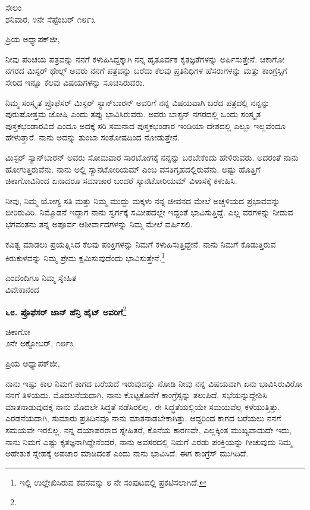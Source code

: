 \begin{flushright}
ಸೇಲಂ\\ಶನಿವಾರ, ೪ನೇ ಸೆಪ್ಟೆಂಬರ್ ೧೮೯೩
\end{flushright}

\noindent
ಪ್ರಿಯ ಅಧ್ಯಾಪಕ್‌ಜೀ,

ನೀವು ಪರಿಚಯ ಪತ್ರವನ್ನು ನನಗೆ ಕಳುಹಿಸಿದ್ದಕ್ಕಾಗಿ ನನ್ನ ಹೃತೂರ್ವಕ ಕೃತಜ್ಞತೆಗಳನ್ನು ಅರ್ಪಿಸುತ್ತೇನೆ. ಚಿಕಾಗೋ ನಗರದ ಮಿಸ್ಟರ್‌ ಥೇಲ್ಸ್ ಅವರು ನನಗೆ ಪತ್ರವನ್ನು ಬರೆದು ಕೆಲವು ಪ್ರತಿನಿಧಿಗಳ ಹೆಸರುಗಳನ್ನು ಮತ್ತು ಕಾಂಗ್ರೆಸ್ಸಿಗೆ ಸೇರಿದ ಇನ್ನೂ ಕೆಲವು ವಿಷಯಗಳನ್ನು ಸೂಚಿಸಿರುವರು.

ನಿಮ್ಮ ಸಂಸ್ಕೃತ ಪ್ರೊಫೆಸರ್ ಮಿಸ್ಟರ್ ಸ್ಯಾನ್‌ಬಾರನ್ ಅವರಿಗೆ ನನ್ನ ವಿಷಯವಾಗಿ ಬರೆದ ಪತ್ರದಲ್ಲಿ ನನ್ನನ್ನು ಪುರುಷೋತ್ತಮ ಜೋಷಿ ಎಂದು ತಪ್ಪು ಭಾವಿಸಿರುವರು. ಅವರು ಬಾಸ್ಟನ್ ನಗರದಲ್ಲಿ ಒಂದು ಸಂಸ್ಕೃತ ಪುಸ್ತಕಭಂಡಾರವಿದೆ ಎಂದೂ ಅದಕ್ಕೆ ಸರಿ ಸಮನಾದ ಪುಸ್ತಕಭಂಡಾರ ಇಂಡಿಯಾ ದೇಶದಲ್ಲಿ ಎಲ್ಲೂ ಇಲ್ಲವೆಂದೂ ಹೇಳುತ್ತಾರೆ. ನಾನು ಅದನ್ನು ತುಂಬಾ ಸಂತೋಷದಿಂದ ನೋಡುತ್ತೇನೆ.

ಮಿಸ್ಟರ್ ಸ್ಯಾನ್‌ಬಾರನ್ ಅವರು ಸೋಮವಾರ ಸಾರಟೋಗಕ್ಕೆ ನನ್ನನ್ನು ಬರಬೇಕೆಂದು ಹೇಳಿರುವರು. ಅದರಂತೆ ನಾನು ಹೋಗುತ್ತಿರುವೆನು. ನಾನು ಅಲ್ಲಿ ಸ್ಯಾನಟೋರಿಯಮ್ ಎಂಬ ವಸತಿಗೃಹದಲ್ಲಿರುವೆನು. ಅಷ್ಟು ಹೊತ್ತಿಗೆ ಚಿಕಾಗೋವಿನಿಂದ ಏನಾದರೂ ಸಮಾಚಾರ ಬಂದರೆ ಸ್ಕಾನಟೋರಿಯಮ್ ವಿಳಾಸಕ್ಕೆ ಕಳುಹಿಸಿ.

ನೀವು, ನಿಮ್ಮ ಯೋಗ್ಯ ಸತಿ ಮತ್ತು ನಿಮ್ಮ ಮುದ್ದು ಮಕ್ಕಳು ನನ್ನ ಜೀವನದ ಮೇಲೆ ಅಚ್ಚಳಿಯದ ಪ್ರಭಾವವನ್ನು ಬೀರಿರುವಿರಿ. ನಿಮ್ಮೊಡನೆ ಇದ್ದಾಗ ನಾನು ಸ್ವರ್ಗಕ್ಕೆ ಸಮೀಪದಲ್ಲೇ ಇದ್ದಂತೆ ಭಾವಿಸುತ್ತಿದ್ದೆ. ಎಲ್ಲ ವರಗಳನ್ನು ನೀಡುವ ಭಗವಂತನು ತನ್ನ ಅಪೂರ್ವ ಆಶೀರ್ವಾದಗಳನ್ನು ನಿಮ್ಮ ಮೇಲೆ ವರ್ಷಿಸಲಿ.

ಕವಿತ್ವ ಮಾಡಲು ಪ್ರಯತ್ನಿಸಿದ ಕೆಲವು ಪಂಕ್ತಿಗಳನ್ನು ನಿಮಗೆ ಕಳುಹಿಸುತ್ತಿದ್ದೇನೆ. ನಾನು ನಿಮಗೆ ಕೊಡುತ್ತಿರುವ ಕಿರುಕುಳವನ್ನು ನಿಮ್ಮ ಪ್ರೇಮ ಕ್ಷಮಿಸುವುದೆಂದು ಭಾವಿಸುತ್ತೇನೆ.\footnote{ಇಲ್ಲಿ ಉಲ್ಲೇಖಿಸಿರುವ ಕವನವನ್ನು ೮ ನೇ ಸಂಪುಟದಲ್ಲಿ ಪ್ರಕಟಿಸಲಾಗಿದೆ.}

{\flushright
ಎಂದೆಂದಿಗೂ ನಿಮ್ಮ ಸ್ನೇಹಿತ\\ವಿವೇಕಾನಂದ\par}

\eject

\begin{center}
\textbf{೬೮. ಪ್ರೊಫೆಸರ್ ಜಾನ್ ಹೆನ್ರಿ ಹೈಟ್ ಅವರಿಗೆ}\footnote{}
\end{center}

\begin{flushright}
ಚಿಕಾಗೋ\\೨ನೇ ಅಕ್ಟೋಬರ್, ೧೮೯೩
\end{flushright}

\noindent
ಪ್ರಿಯ ಅಧ್ಯಾಪಕ್‌ಜೀ,

ನಾನು ಇಷ್ಟು ಕಾಲ ನಿಮಗೆ ಕಾಗದ ಬರೆಯದೆ ಇರುವುದನ್ನು ನೋಡಿ ನೀವು ನನ್ನ ವಿಷಯವಾಗಿ ಏನು ಭಾವಿಸಿರುವಿರೋ ನನಗೆ ತಿಳಿಯದು. ಮೊದಲನೆಯದಾಗಿ, ನಾನು ಕೊಟ್ಟಕೊನೆಗೆ ಕಾಂಗ್ರೆಸ್ಸನ್ನು ತಲುಪಿದೆ. ಸಭೆಯನ್ನುದ್ದೇಶಿಸಿ ಮಾತನಾಡುವುದಕ್ಕೆ ನಾನು ಮೊದಲೇ ಸಿದ್ಧತೆ ನಡೆಸಿರಲಿಲ್ಲ. ಈ ಸಿದ್ಧತೆಯಲ್ಲಿಯೇ ಸಮಯವೆಲ್ಲ ಕಳೆಯುತ್ತಿತ್ತು. ಎರಡನೆಯದಾಗಿ, ಸುಮಾರು ಪ್ರತಿದಿನವೂ ನಾನು ಮಾತನಾಡಬೇಕಾಗಿತ್ತು. ಆದ್ದರಿಂದ ಕಾಗದ ಬರೆಯಲು ನನಗೆ ಸಮಯವೇ ಇರಲಿಲ್ಲ. ನನ್ನ ದಯಾಪರರಾದ ಸ್ನೇಹಿತರೆ, ಕೊನೆಯ ಕಾರಣವೇ, ಎಲ್ಲಕ್ಕಿಂತ ಮುಖ್ಯವಾದುದೇ ಇದು, ನಾನು ನಿಮಗೆ ಎಷ್ಟು ಕೃತಜ್ಞನಾಗಿದ್ದೇನೆಂದರೆ, ನಾನು ಅವಸರದಲ್ಲಿ ನಿಮಗೆ ಎರಡು ಪಂಕ್ತಿಯನ್ನು ಗೀಚುವುದು ನಿಮ್ಮ ಅಹೇತುಕ ಸ್ನೇಹಕ್ಕೆ ಅಪಚಾರ ಮಾಡಿದಂತೆ ಎಂದು ನಾನು ಭಾವಿಸಿದೆ. ಈಗ ಕಾಂಗ್ರೆಸ್ ಮುಗಿದಿದೆ.

